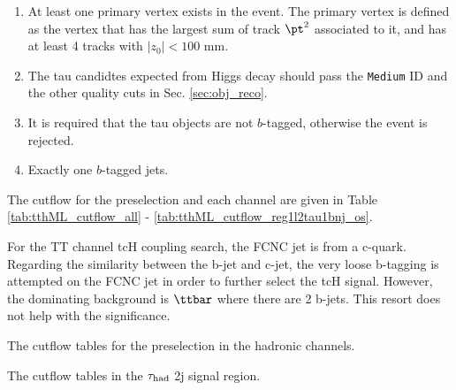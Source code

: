 \begin{enumerate}
\item At least one primary vertex exists in the event. The primary vertex is defined as the vertex that has the largest sum of track $\pt^2$ associated to it, and has at least 4 tracks with $|z_0|<100$ mm.
\item The tau candidtes expected from Higgs decay should pass the \texttt{Medium} ID and the other quality cuts in Sec. \ref{sec:obj_reco}.
\item It is required that the tau objects are not $b$-tagged, otherwise the event is rejected.
\item Exactly one $b$-tagged jets. 
\end{enumerate}



The cutflow for the preselection and each channel are given in Table \ref{tab:tthML_cutflow_all} - \ref{tab:tthML_cutflow_reg1l2tau1bnj_os}.

For the TT channel tcH coupling search, the FCNC jet is from a c-quark. Regarding the similarity between the b-jet and c-jet, the very loose b-tagging is attempted on the FCNC jet in order to further select the tcH signal. However, the dominating background is $\ttbar$ where there are 2 b-jets. This resort does not help with the significance.

\begin{table}
\label{tab:xTFW_cutflow_all}
\caption{The cutflow tables for the preselection in the hadronic channels.}
\footnotesize

\end{table}




\begin{table}
\caption{The cutflow tables in the $\tau_\text{had}$ 2j signal region.}

\end{table}




